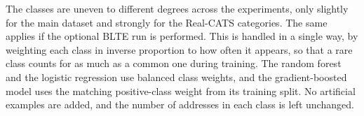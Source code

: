 The classes are uneven to different degrees across the experiments, only
slightly for the main dataset and strongly for the Real-CATS categories. The
same applies if the optional BLTE run is performed. This is handled in a single
way, by weighting each class in inverse proportion to how often it appears, so
that a rare class counts for as much as a common one during training. The random
forest and the logistic regression use balanced class weights, and the
gradient-boosted model uses the matching positive-class weight from its training
split. No artificial examples are added, and the number of addresses in each
class is left unchanged.

